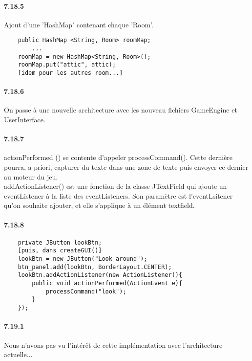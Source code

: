 \documentclass[11pt,a4paper]{report}
\begin{document}
\paragraph{7.18.5}
Ajout d'une 'HashMap' contenant chaque 'Room'.

\begin{lstlisting}
    public HashMap <String, Room> roomMap;
    	...
    roomMap = new HashMap<String, Room>();
    roomMap.put("attic", attic);
	[idem pour les autres room...]
\end{lstlisting}

\paragraph{7.18.6}

On passe à une nouvelle architecture avec les nouveau fichiers GameEngine et UserInterface.

\paragraph{7.18.7}
actionPerformed () se contente d'appeler processCommand().
Cette dernière pourra, a priori, capturer du texte dans une zone de texte puis envoyer ce dernier au moteur du jeu.\\

addActionListener() est une fonction de la classe JTextField qui ajoute
    un eventListener à la liste des eventListeners.
    Son paramètre est l'eventLsitener qu'on souhaite ajouter,
    et elle s'applique à un élément textfield.

\paragraph{7.18.8}
\begin{lstlisting}
    private JButton lookBtn;
	[puis, dans createGUI()]
    lookBtn = new JButton("Look around");
    btn_panel.add(lookBtn, BorderLayout.CENTER);
    lookBtn.addActionListener(new ActionListener(){
        public void actionPerformed(ActionEvent e){
            processCommand("look");
        }
    });
\end{lstlisting}

\paragraph{7.19.1}
Nous n'avons pas vu l’intérêt de cette implémentation avec l'architecture actuelle...
\end{document}

